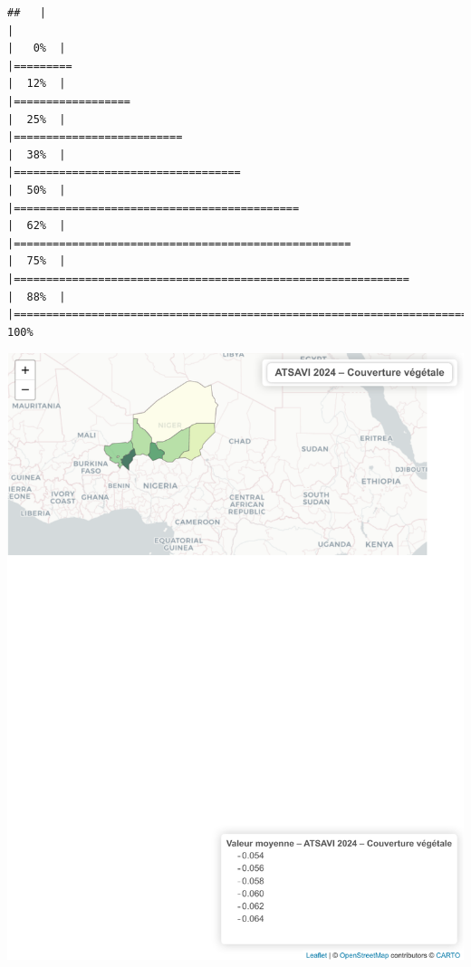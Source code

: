 \documentclass[
]{book}
\begin{document}
\begin{verbatim}
##   |                                                                              |                                                                      |   0%  |                                                                              |=========                                                             |  12%  |                                                                              |==================                                                    |  25%  |                                                                              |==========================                                            |  38%  |                                                                              |===================================                                   |  50%  |                                                                              |============================================                          |  62%  |                                                                              |====================================================                  |  75%  |                                                                              |=============================================================         |  88%  |                                                                              |======================================================================| 100%
\end{verbatim}

\includegraphics{Atlas-Spectral-Sahel_files/figure-latex/vegetation-atsavi-1.pdf}
\end{document}
